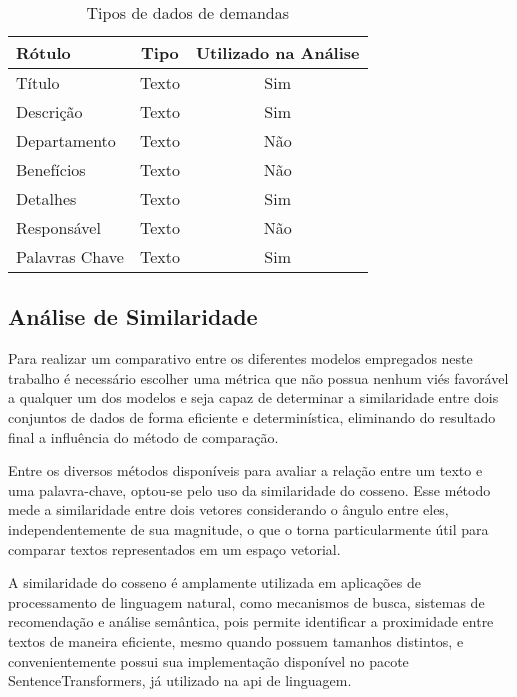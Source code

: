 \begin{table}[H]
    \caption{Tipos de dados de demandas}
    \label{tab:dados_demandas}
    \begin{tabular}{lcc}
        \hline
        \textbf{Rótulo} & \textbf{Tipo} & \textbf{Utilizado na Análise} \\ \hline
        Título          & Texto         & Sim                           \\
        Descrição       & Texto         & Sim                           \\
        Departamento    & Texto         & Não                           \\
        Benefícios      & Texto         & Não                           \\
        Detalhes        & Texto         & Sim                           \\
        Responsável     & Texto         & Não                           \\
        Palavras Chave  & Texto         & Sim                           \\ \hline
    \end{tabular}
    \fonte{}
\end{table}

\subsection{Análise de Similaridade}\label{subsec:cossine_similarity}

Para realizar um comparativo entre os diferentes modelos empregados neste trabalho é necessário escolher uma métrica que não possua nenhum viés favorável a qualquer um dos modelos e seja capaz de determinar a similaridade entre dois conjuntos de dados de forma eficiente e determinística, eliminando do resultado final a influência do método de comparação.

Entre os diversos métodos disponíveis para avaliar a relação entre um texto e uma palavra-chave, optou-se pelo uso da similaridade do cosseno. Esse método mede a similaridade entre dois vetores considerando o ângulo entre eles, independentemente de sua magnitude, o que o torna particularmente útil para comparar textos representados em um espaço vetorial.

A similaridade do cosseno é amplamente utilizada em aplicações de processamento de linguagem natural, como mecanismos de busca, sistemas de recomendação e análise semântica, pois permite identificar a proximidade entre textos de maneira eficiente, mesmo quando possuem tamanhos distintos, e convenientemente possui sua implementação disponível no pacote SentenceTransformers, já utilizado na \gls{api} de linguagem.

